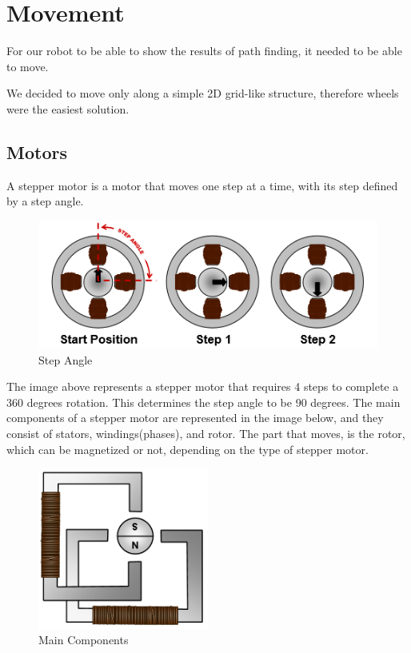 \chapter{Movement}\label{ch:move}
For our robot to be able to show the results of path finding,
it needed to be able to move.

We decided to move only along a simple 2D grid-like structure,
therefore wheels were the easiest solution.
\section{Motors}\label{sec:motors}
A stepper motor is a motor that moves one step at a time, with its step defined by a step angle.

\begin{figure}[h]
	\centering
	\includegraphics[width=\textwidth]{figures/move/motor1.png}
	\caption{Step Angle}
\end{figure}

The image above represents a stepper motor that requires 4 steps to complete a 360 degrees rotation. This determines the step angle to be 90 degrees. 
The main components of a stepper motor are represented in the image below, and they consist of stators, windings(phases), and rotor.
The part that moves, is the rotor, which can be magnetized or not, depending on the type of stepper motor.

\begin{figure}[h]
	\centering
	\includegraphics[width=0.5\textwidth]{figures/move/motor2.png}
	\caption{Main Components}
\end{figure}

